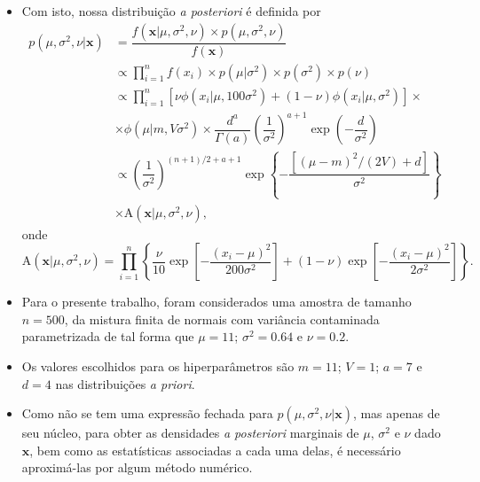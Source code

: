 \documentclass[9pt]{beamer}
\begin{document}
\begin{frame}
\begin{itemize}
\justifying	
\item Com isto, nossa distribuição \textit{a posteriori} é definida por
\small
\begin{align}
p(\mu, \sigma^2, \nu | \mathbf{x})
&= \dfrac{f(\mathbf{x} | \mu, \sigma^2, \nu) \times p(\mu, \sigma^2, \nu)}{f(\mathbf{x})} \nonumber \\
&\propto \prod_{i=1}^{n} f(x_i) \times p(\mu | \sigma^2) \times p(\sigma^2) \times p(\nu) \nonumber\\
&\propto \prod_{i=1}^{n} \left[ \nu \phi(x_i | \mu, 100 \sigma^2) + (1 - \nu) \phi(x_i | \mu, \sigma^2) \right] \times \nonumber \\
&\times \phi(\mu | m, V \sigma^2) \times \dfrac{d^a}{\Gamma(a)} \left(\dfrac{1}{\sigma^2}\right)^{a + 1} \exp\left(-\dfrac{d}{\sigma^2}\right) \nonumber \\
&\propto \left(\dfrac{1}{\sigma^2}\right)^{(n + 1)/2 + a + 1} \exp\left\{-\dfrac{\left[(\mu - m)^2 / (2V) + d\right]}{\sigma^2}\right\} \nonumber \\
&\times \textrm{A}(\mathbf{x} | \mu, \sigma^2, \nu), \label{eq:dist_post}
\end{align}
\normalsize
onde
\begin{equation*}
\textrm{A}(\mathbf{x} | \mu, \sigma^2, \nu) = \prod_{i=1}^{n} \left\{  \dfrac{\nu}{10} \exp\left[-\dfrac{(x_i - \mu)^2}{200\sigma^2}\right] + (1 - \nu) \exp\left[-\dfrac{(x_i - \mu)^2}{2\sigma^2}\right] \right\}.
\end{equation*}
\end{itemize}
\end{frame}
\begin{frame}
\begin{itemize}
\justifying	
\item Para o presente trabalho, foram considerados uma amostra de tamanho $n=500$, da mistura finita de normais com variância contaminada parametrizada de tal forma que $\mu = 11$; $\sigma^2 = 0.64$ e $\nu = 0.2$.
\item Os valores escolhidos para os hiperparâmetros são $m = 11$; $V = 1$; $a = 7$ e $d = 4$ nas distribuições \textit{a priori}.
\item Como não se tem uma expressão fechada para $p(\mu, \sigma^2, \nu | \mathbf{x})$, mas apenas de seu núcleo, para obter as densidades \textit{a posteriori} marginais de $\mu$, $\sigma^2$ e $\nu$ dado $\mathbf{x}$, bem como as estatísticas associadas a cada uma delas, é necessário aproximá-las por algum método numérico.
\end{itemize}
\end{frame}
\end{document}
